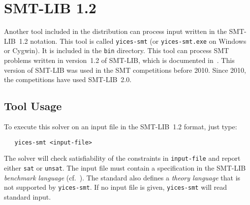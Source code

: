 \documentclass[11pt,twoside,fleqn,openright,titlepage]{cslreport}
\begin{document}


\section{SMT-LIB 1.2}

Another tool included in the distribution can process input written in
the SMT-LIB~1.2 notation. This tool is called \texttt{yices-smt} (or
\texttt{yices-smt.exe} on Windows or Cygwin). It is included in the
\texttt{bin} directory.  This tool can process SMT problems written in
version~1.2 of SMT-LIB, which is documented
in~\cite{SMTLIB12:2006}. This version of SMT-LIB was used in the SMT
competitions before 2010.  Since 2010, the competitions have used
SMT-LIB~2.0.


\subsection{Tool Usage}

To execute this solver on an input file in the SMT-LIB~1.2 format, just type:
\begin{small}
\begin{verbatim}
   yices-smt <input-file>
\end{verbatim}
\end{small}
The solver will check satisfiability of the constraints in
\texttt{input-file} and report either \texttt{sat} or
\texttt{unsat}. The input file must contain a specification in the
SMT-LIB {\em benchmark language\/} (cf.~\cite{SMTLIB12:2006}). The
standard also defines a {\em theory language\/} that is not supported
by \texttt{yices-smt}. If no input file is given, \texttt{yices-smt}
will read standard input.
\end{document}
